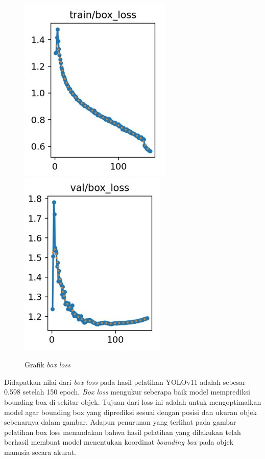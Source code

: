 \begin{figure} [H] \centering
  \includegraphics[scale=0.55]{gambar/train box loss.jpg}
  \includegraphics[scale=0.55]{gambar/val box loss.jpg}
  \caption{Grafik \emph{box loss}}
  \label{fig:Pengujian Performa}
\end{figure}
Didapatkan nilai dari \emph{box loss} pada hasil pelatihan YOLOv11 adalah sebesar 0.598
setelah 150 epoch. \emph{Box loss} mengukur seberapa baik model memprediksi bounding
box di sekitar objek. Tujuan dari loss ini adalah untuk mengoptimalkan model
agar bounding box yang diprediksi sesuai dengan posisi dan ukuran objek sebenarnya dalam gambar.
Adapun penurunan yang terlihat pada gambar pelatihan box loss menandakan bahwa hasil
pelatihan yang dilakukan telah berhasil membuat model menentukan koordinat \emph{bounding box}
pada objek manusia secara akurat.

